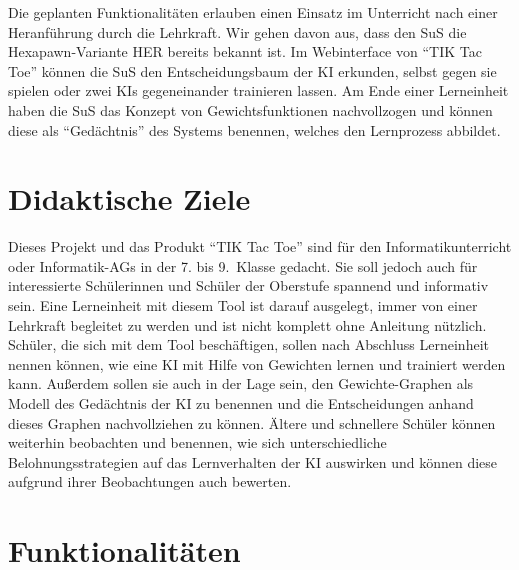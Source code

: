 \documentclass[titlepage]{scrartcl}
\newcommand{\TicTacToe}{TI\reflectbox K Tac Toe}
\begin{document}
Die geplanten Funktionalitäten erlauben einen Einsatz im Unterricht nach einer Heranführung durch die Lehrkraft.
Wir gehen davon aus, dass den SuS die Hexapawn-Variante HER bereits bekannt ist.
Im Webinterface von "`\TicTacToe"' können die SuS den Entscheidungsbaum der KI erkunden, selbst gegen sie spielen oder zwei KIs gegeneinander trainieren lassen.
Am Ende einer Lerneinheit haben die SuS das Konzept von Gewichtsfunktionen nachvollzogen und können diese als "`Gedächtnis"' des Systems benennen, welches den Lernprozess abbildet.

\section{Didaktische Ziele}
Dieses Projekt und das Produkt "`\TicTacToe"' sind für den Informatikunterricht oder Informatik-AGs in der 7. bis 9.\ Klasse gedacht.
Sie soll jedoch auch für interessierte Schülerinnen und Schüler der Oberstufe spannend und informativ sein.
Eine Lerneinheit mit diesem Tool ist darauf ausgelegt, immer von einer Lehrkraft begleitet zu werden und ist nicht komplett ohne Anleitung nützlich.
Schüler, die sich mit dem Tool beschäftigen, sollen nach Abschluss Lerneinheit nennen können, wie eine KI mit Hilfe von Gewichten lernen und trainiert werden kann.
Außerdem sollen sie auch in der Lage sein, den Gewichte-Graphen als Modell des Gedächtnis der KI zu benennen und die Entscheidungen anhand dieses Graphen nachvollziehen zu können.
Ältere und schnellere Schüler können weiterhin beobachten und benennen,
wie sich unterschiedliche Belohnungsstrategien auf das Lernverhalten der KI auswirken und können diese aufgrund ihrer Beobachtungen auch bewerten.

\section{Funktionalitäten}%
\end{document}
